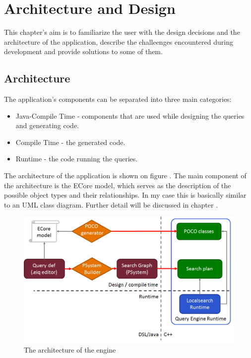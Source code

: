 \chapter{Architecture and Design}

This chapter's aim is to familiarize the user with the design decisions and the
architecture of the application, describe the challeenges encountered during
development and provide solutions to some of them.

\section{Architecture}\label{sec:Architecture}

The application's components can be separated into three main categories:

\begin{itemize}
  \item Java-Compile Time - components that are used while designing the
  queries and generating code.
  \item \CPP{} Compile Time - the generated code.
  \item \CPP{} Runtime - the code running the queries.
\end{itemize}

The architecture of the application is shown on figure .
The main component of the architecture is the ECore model, which serves as
the description of the possible object types and their relationships.
In my case this is basically similar to an UML class diagram. Further
detail will be discussed in chapter .

\begin{figure}[!ht]
\centering
\includegraphics[width=150mm, keepaspectratio]{figures/architecture.png}
\caption{The architecture of the engine}
\label{fig:architecture}
\end{figure}

